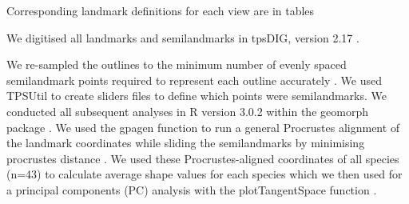 \documentclass[12pt,a4paper]{article}
\begin{document}
	
	Corresponding landmark definitions for each view are in tables %
	
	We digitised all landmarks and semilandmarks in tpsDIG, version 2.17 \citep{Rohlf2013}.

	We re-sampled the outlines to the minimum number of evenly spaced semilandmark points required to represent each outline accurately \citep[][details in supplementary material]{MacLeod2013}. We used TPSUtil \citep{Rohlf2012} to create sliders files \citep{Zelditch2012} to define which points were semilandmarks. We conducted all subsequent analyses in R version 3.0.2 \citep[R Development Core][]{Team2013} within the geomorph package \citep{Adams2013}. We used the gpagen function to run a general Procrustes alignment \citep{Rohlf1993} of the landmark coordinates while sliding the semilandmarks by minimising procrustes distance \citep{Bookstein1997}. We used these Procrustes-aligned coordinates of all species (n=43) to calculate average shape values for each species which we then used for a principal components (PC) analysis with the plotTangentSpace function \citep{Adams2013}. 
\end{document}
